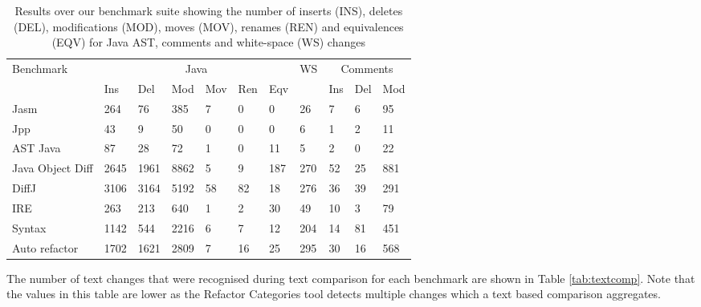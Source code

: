 \begin{table}[t!]
    \small
    \begin{tabular}{l|llllll|l|lll}
    Benchmark        & \multicolumn{6}{|c|}{Java}           & WS & \multicolumn{3}{|c}{Comments} \\ \cline{2-7} \cline{9-11}
    ~                & Ins  & Del  & Mod  & Mov & Ren & Eqv & ~          & Ins      & Del & Mod  \\ \hline
    Jasm             & 264  & 76   & 385  & 7   & 0   & 0   & 26         & 7        & 6   & 95   \\
    Jpp              & 43   & 9    & 50   & 0   & 0   & 0   & 6          & 1        & 2   & 11   \\
    AST Java         & 87   & 28   & 72   & 1   & 0   & 11  & 5          & 2        & 0   & 22   \\
    \begin{minipage}[t]{0.15\textwidth}Java Object Diff\end{minipage} & 2645 & 1961 & 8862 & 5   & 9   & 187 & 270        & 52       & 25 & 881 \\
    DiffJ            & 3106 & 3164 & 5192 & 58  & 82  & 18  & 276        & 36       & 39  & 291  \\
    IRE              & 263  & 213  & 640  & 1   & 2   & 30  & 49         & 10       & 3   & 79   \\
    Syntax           & 1142 & 544  & 2216 & 6   & 7   & 12  & 204        & 14       & 81  & 451  \\
    Auto refactor    & 1702 & 1621 & 2809 & 7   & 16  & 25  & 295        & 30       & 16  & 568  \\
    \end{tabular}
    \caption{Results over our benchmark suite showing the number of inserts (INS), deletes (DEL), modifications (MOD), moves (MOV), renames (REN) and equivalences (EQV) for Java AST, comments and white-space (WS) changes}
    \label{tab:results}
\end{table}

The number of text changes that were recognised during text comparison for each benchmark are shown in Table \ref{tab:textcomp}. Note that the values in this table are lower as the Refactor Categories tool detects multiple changes which a text based comparison aggregates.  


